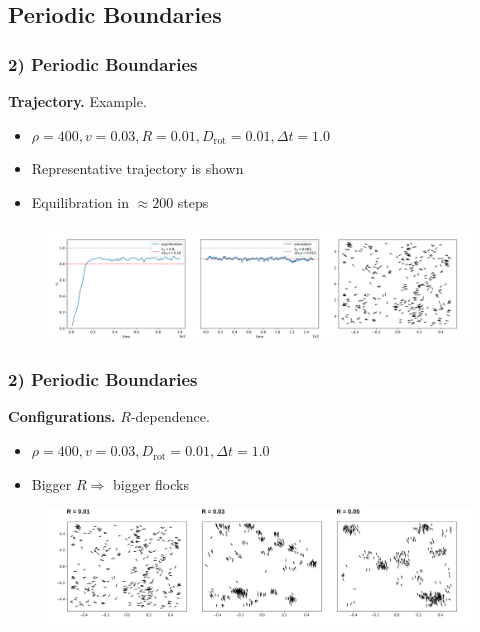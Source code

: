 \subsection{Periodic Boundaries}

\begin{frame}
	\frametitle{2) Periodic Boundaries}
	\textbf{Trajectory.} Example.
	\begin{itemize}
	    \item $\rho = 400, v = 0.03, R = 0.01, D_{\text{rot}} = 0.01, \Delta t = 1.0$
	    \item Representative trajectory is shown
	    \item Equilibration in $\approx 200$ steps
	\end{itemize}
	\begin{figure}[H]
  		\includegraphics[width=\textwidth]{images/chapter2/flocks_N_20_L_1.000000_v_0.030000_R_0.010000_D_0.010000.png} 
	\end{figure}
\end{frame}

\begin{frame}
	\frametitle{2) Periodic Boundaries}
	\textbf{Configurations.} $R$-dependence.
	\begin{itemize}
	    \item $\rho = 400, v = 0.03, D_{\text{rot}} = 0.01, \Delta t = 1.0$
	    \item Bigger $R\Rightarrow$ bigger flocks 
	\end{itemize}
	\begin{figure}[H]
  		\includegraphics[width=\textwidth]{images/chapter2/N_20_L_1.000000_v_0.030000_R_D_0.010000.png} 
	\end{figure}
\end{frame}

